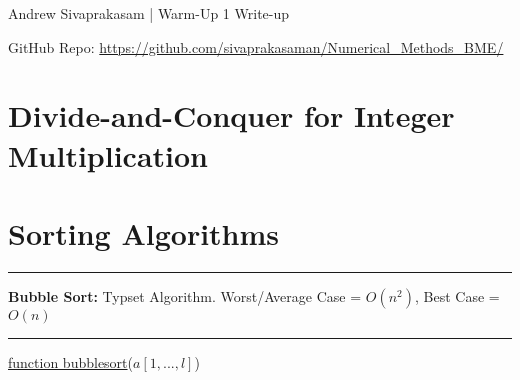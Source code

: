 \documentclass[9pt]{extarticle}
\begin{document}
{\huge Andrew Sivaprakasam | Warm-Up 1 Write-up}

GitHub Repo: \url{https://github.com/sivaprakasaman/Numerical_Methods_BME/} 

\section{Divide-and-Conquer for Integer Multiplication}

\section{Sorting Algorithms}

\hrule
\vspace{6pt}
\large\textbf{Bubble Sort:} Typset Algorithm. Worst/Average Case = $O(n^2)$, Best Case = $O(n)$ 
\vspace{6pt}
\hrule

\begin{algorithm}[H]

\underline{function bubblesort}($a[1,...,l]$)

\vspace{6pt}
\BlankLine
{}
\vspace{6pt}
\end{algorithm}
\end{document}
